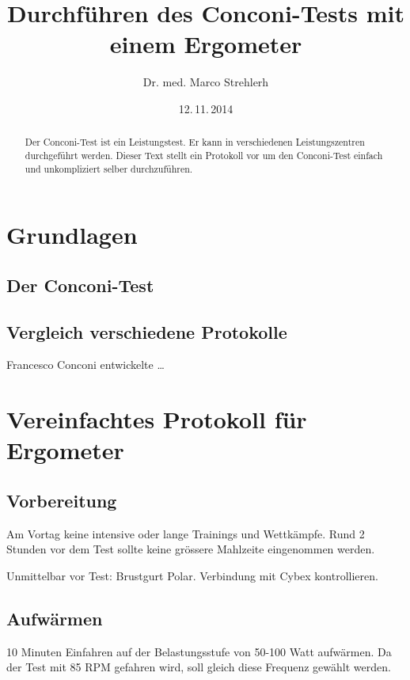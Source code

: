 \documentclass[a4paper,DIV11,BCOR1cm]{scrartcl}
\begin{document}

\title{Durchführen des Conconi-Tests mit einem Ergometer}
\author{Dr. med. Marco Strehlerh}
\date{12.\,11.\,2014}

\maketitle

\begin{abstract}
Der Conconi-Test ist ein Leistungstest.
Er kann in verschiedenen Leistungszentren durchgeführt werden.
Dieser Text stellt ein Protokoll vor um den Conconi-Test einfach und unkompliziert
selber durchzuführen.
\end{abstract}

\tableofcontents

\section{Grundlagen}

\subsection{Der Conconi-Test}

\subsection{Vergleich verschiedene Protokolle}

Francesco Conconi entwickelte \ldots


\section{Vereinfachtes Protokoll für Ergometer}

\subsection{Vorbereitung}

Am Vortag keine intensive oder lange Trainings und Wettkämpfe.
Rund 2 Stunden vor dem Test sollte keine grössere Mahlzeite eingenommen werden.

Unmittelbar vor Test: Brustgurt Polar. Verbindung mit Cybex kontrollieren.

\subsection{Aufwärmen}
10 Minuten Einfahren auf der Belastungsstufe von 50-100 Watt aufwärmen. Da der Test mit 85 RPM gefahren wird, soll gleich diese Frequenz gewählt werden. 
\end{document}
